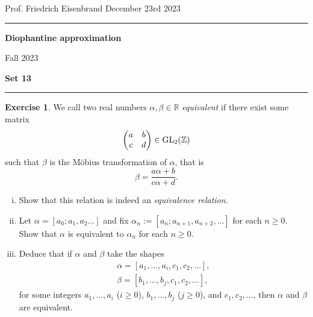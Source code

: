 \documentclass[12pt,a4paper]{article}
\date{}
\theoremstyle{plain}
\newtheorem*{Sol*}{Solution}
\theoremstyle{definition}
\newtheorem{Ex}{Exercise}
\def \R {\mathbb R}
\def \Z {\mathbb Z}
\newif\ifsolutions
\newcommand{\exercise}[2]{
			\begin{Ex} #1 \end{Ex}
			\ifsolutions  \begin{Sol*} #2 \end{Sol*} \bigskip \else \bigskip  \fi
		}
\begin{document}
\begin{center}
{Prof. Friedrich Eisenbrand \hfill December 23rd 2023}
\end{center}
	
\hrule\vspace{\baselineskip}

\begin{center}
\textbf{Diophantine approximation}

Fall 2023

\bigskip

\textbf{Set 13}
\ifsolutions{\textbf{- Solutions}} \else{} \fi
\end{center}

\hrule\vspace{\baselineskip}




\exercise{\label{ex:1}
	We call two real numbers $\alpha, \beta \in \R$ \emph{equivalent} if there exist some matrix
		\[ \begin{pmatrix} a & b \\ c & d \end{pmatrix} \in {\rm GL}_2(\Z) \]
	such that $\beta$ is the Möbius transformation of $\alpha$, that is
		\[ \beta = \frac{a \alpha + b}{c \alpha + d}. \]
	
	\begin{enumerate}[i)]
		\item Show that this relation is indeed an \emph{equivalence relation}.
		\item Let $\alpha = [a_0;a_1, a_2 \dots]$ and fix $\alpha_n := [a_n; a_{n+1}, a_{n+2}, \dots]$ for each $n \geq 0$.
		Show that $\alpha$ is equivalent to $\alpha_n$ for each $n \geq 0$.

		\item Deduce that if $\alpha$ and $\beta$ take the shapes
			\begin{gather*}
				\alpha = [a_1, \dots, a_i, c_1, c_2, \dots], \\
				\beta = [b_1, \dots, b_j, c_1, c_2, \dots],
			\end{gather*}
		for some integers $a_1, \dots, a_i$ ($i \geq 0$), $b_1, \dots, b_j$ ($j\geq0$), and $c_1, c_2, \dots$,
		then $\alpha$ and $\beta$ are equivalent.
	\end{enumerate}
}
{}
\end{document}
